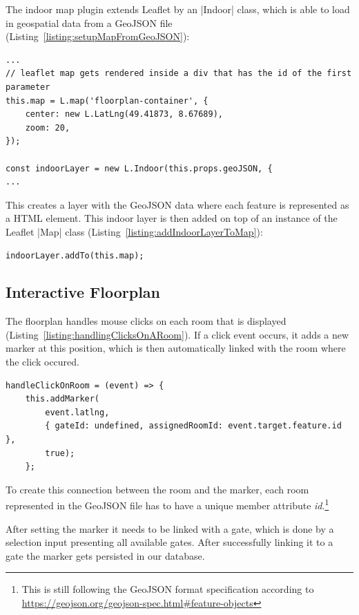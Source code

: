 The indoor map plugin extends Leaflet by an |Indoor| class, which is able to load in geospatial data from a GeoJSON file (Listing~\ref{listing:setupMapFromGeoJSON}):

\begin{lstlisting}[label={listing:setupMapFromGeoJSON},caption={Setup map from GeoJSON data}]
...
// leaflet map gets rendered inside a div that has the id of the first parameter
this.map = L.map('floorplan-container', {
	center: new L.LatLng(49.41873, 8.67689),
	zoom: 20,
});

const indoorLayer = new L.Indoor(this.props.geoJSON, {
...
\end{lstlisting}

This creates a layer with the GeoJSON data where each feature is represented as a HTML element.
This indoor layer is then added on top of an instance of the  Leaflet |Map|\cite{leaflet:map} class (Listing~\ref{listing:addIndoorLayerToMap}):

\begin{lstlisting}[label={listing:addIndoorLayerToMap},caption={Adding indoor layer to map}]
indoorLayer.addTo(this.map);
\end{lstlisting}


\subsection{Interactive Floorplan}
\label{Interactive Floorplan}

The floorplan handles mouse clicks on each room that is displayed (Listing~\ref{listing:handlingClicksOnARoom}). If a click event occurs, it adds a new marker at this position, which is then automatically linked with the room where the click occured.

\begin{lstlisting}[label={listing:handlingClicksOnARoom},caption={Handling clicks on a room}]
handleClickOnRoom = (event) => {
	this.addMarker(
		event.latlng, 
		{ gateId: undefined, assignedRoomId: event.target.feature.id }, 
		true);
	};
\end{lstlisting}

To create this connection between the room and the marker, each room represented in the GeoJSON file has to have a unique member attribute \emph{id}.\footnote{This is still following the GeoJSON format specification according to \url{https://geojson.org/geojson-spec.html\#feature-objects}}

After setting the marker it needs to be linked with a gate, which is done by a selection input presenting all available gates. After successfully linking it to a gate the marker gets persisted in our database.


